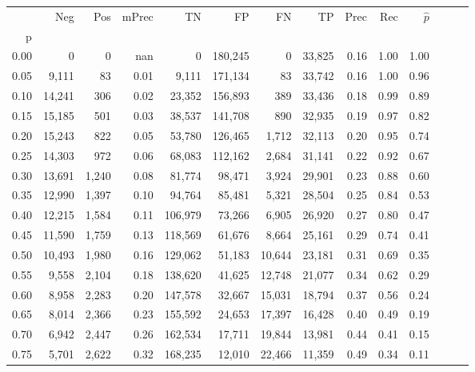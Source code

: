 \begin{tabular}{rrrrrrrrrrrrrr}
\toprule
{} &     Neg &    Pos & mPrec &       TN &       FP &      FN &      TP &  Prec &   Rec & $\hat{p}$ \\
p    &         &        &       &          &          &         &         &       &       &           \\
\midrule
0.00 &       0 &      0 &   nan &        0 &  180,245 &       0 &  33,825 &  0.16 &  1.00 &      1.00 \\
0.05 &   9,111 &     83 &  0.01 &    9,111 &  171,134 &      83 &  33,742 &  0.16 &  1.00 &      0.96 \\
0.10 &  14,241 &    306 &  0.02 &   23,352 &  156,893 &     389 &  33,436 &  0.18 &  0.99 &      0.89 \\
0.15 &  15,185 &    501 &  0.03 &   38,537 &  141,708 &     890 &  32,935 &  0.19 &  0.97 &      0.82 \\
0.20 &  15,243 &    822 &  0.05 &   53,780 &  126,465 &   1,712 &  32,113 &  0.20 &  0.95 &      0.74 \\
0.25 &  14,303 &    972 &  0.06 &   68,083 &  112,162 &   2,684 &  31,141 &  0.22 &  0.92 &      0.67 \\
0.30 &  13,691 &  1,240 &  0.08 &   81,774 &   98,471 &   3,924 &  29,901 &  0.23 &  0.88 &      0.60 \\
0.35 &  12,990 &  1,397 &  0.10 &   94,764 &   85,481 &   5,321 &  28,504 &  0.25 &  0.84 &      0.53 \\
0.40 &  12,215 &  1,584 &  0.11 &  106,979 &   73,266 &   6,905 &  26,920 &  0.27 &  0.80 &      0.47 \\
0.45 &  11,590 &  1,759 &  0.13 &  118,569 &   61,676 &   8,664 &  25,161 &  0.29 &  0.74 &      0.41 \\
0.50 &  10,493 &  1,980 &  0.16 &  129,062 &   51,183 &  10,644 &  23,181 &  0.31 &  0.69 &      0.35 \\
0.55 &   9,558 &  2,104 &  0.18 &  138,620 &   41,625 &  12,748 &  21,077 &  0.34 &  0.62 &      0.29 \\
0.60 &   8,958 &  2,283 &  0.20 &  147,578 &   32,667 &  15,031 &  18,794 &  0.37 &  0.56 &      0.24 \\
0.65 &   8,014 &  2,366 &  0.23 &  155,592 &   24,653 &  17,397 &  16,428 &  0.40 &  0.49 &      0.19 \\
0.70 &   6,942 &  2,447 &  0.26 &  162,534 &   17,711 &  19,844 &  13,981 &  0.44 &  0.41 &      0.15 \\
0.75 &   5,701 &  2,622 &  0.32 &  168,235 &   12,010 &  22,466 &  11,359 &  0.49 &  0.34 &      0.11 \\

\end{tabular}
